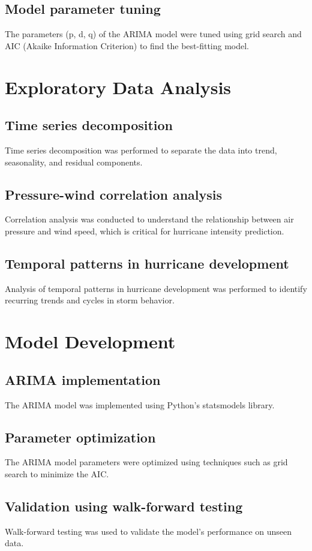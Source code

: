 \documentclass{article}
\begin{document}
	\subsection{Model parameter tuning}
	The parameters (p, d, q) of the ARIMA model were tuned using grid search and AIC (Akaike Information Criterion) to find the best-fitting model.
	
	\section{Exploratory Data Analysis}
	\subsection{Time series decomposition}
	Time series decomposition was performed to separate the data into trend, seasonality, and residual components.
	
	\subsection{Pressure-wind correlation analysis}
	Correlation analysis was conducted to understand the relationship between air pressure and wind speed, which is critical for hurricane intensity prediction.
	
	\subsection{Temporal patterns in hurricane development}
	Analysis of temporal patterns in hurricane development was performed to identify recurring trends and cycles in storm behavior.
	
	\section{Model Development}
	\subsection{ARIMA implementation}
	The ARIMA model was implemented using Python's statsmodels library.
	
	\subsection{Parameter optimization}
	The ARIMA model parameters were optimized using techniques such as grid search to minimize the AIC.
	
	\subsection{Validation using walk-forward testing}
	Walk-forward testing was used to validate the model's performance on unseen data.
	
\end{document}
